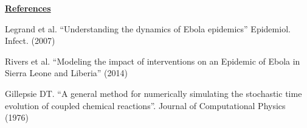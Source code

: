 \documentclass[11pt,letter]{article}
\begin{document}
\underline{\textbf{References}}\vspace{0.5mm}
\begin{enumerate}[ {[}1{]} ]
\item{Legrand et al. ``Understanding the dynamics of Ebola epidemics'' Epidemiol. Infect. (2007)}
\item{Rivers et al. ``Modeling the impact of interventions on an Epidemic of Ebola in Sierra Leone and Liberia'' (2014)}
\item{Gillepsie DT. ``A general method for numerically simulating the stochastic time evolution of coupled chemical reactions''. Journal of Computational Physics (1976)}
\end{enumerate}
\end{document}
